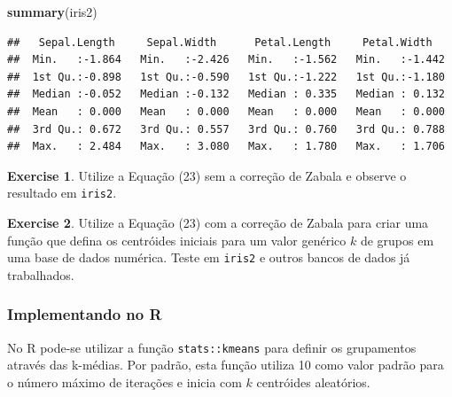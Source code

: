 \documentclass[
]{book}
\newenvironment{Shaded}{\begin{snugshade}}{\end{snugshade}}
\newcommand{\ControlFlowTok}[1]{\textcolor[rgb]{0.13,0.29,0.53}{\textbf{#1}}}
\newcommand{\DataTypeTok}[1]{\textcolor[rgb]{0.13,0.29,0.53}{#1}}
\newcommand{\DecValTok}[1]{\textcolor[rgb]{0.00,0.00,0.81}{#1}}
\newcommand{\KeywordTok}[1]{\textcolor[rgb]{0.13,0.29,0.53}{\textbf{#1}}}
\newcommand{\NormalTok}[1]{#1}
\newcommand{\OperatorTok}[1]{\textcolor[rgb]{0.81,0.36,0.00}{\textbf{#1}}}
\newcommand{\StringTok}[1]{\textcolor[rgb]{0.31,0.60,0.02}{#1}}
\theoremstyle{definition}
\theoremstyle{definition}
\theoremstyle{definition}
\newtheorem{exercise}{Exercise}[chapter]
\theoremstyle{remark}
\begin{document}
\begin{Shaded}
\begin{Highlighting}[]
\KeywordTok{summary}\NormalTok{(iris2)}
\end{Highlighting}
\end{Shaded}

\begin{verbatim}
##   Sepal.Length     Sepal.Width      Petal.Length     Petal.Width    
##  Min.   :-1.864   Min.   :-2.426   Min.   :-1.562   Min.   :-1.442  
##  1st Qu.:-0.898   1st Qu.:-0.590   1st Qu.:-1.222   1st Qu.:-1.180  
##  Median :-0.052   Median :-0.132   Median : 0.335   Median : 0.132  
##  Mean   : 0.000   Mean   : 0.000   Mean   : 0.000   Mean   : 0.000  
##  3rd Qu.: 0.672   3rd Qu.: 0.557   3rd Qu.: 0.760   3rd Qu.: 0.788  
##  Max.   : 2.484   Max.   : 3.080   Max.   : 1.780   Max.   : 1.706
\end{verbatim}

\begin{exercise}
\protect\hypertarget{exr:unnamed-chunk-166}{}{\label{exr:unnamed-chunk-166} }Utilize a Equação (23) sem a correção de Zabala e observe o resultado em \texttt{iris2}.
\end{exercise}

\begin{exercise}
\protect\hypertarget{exr:unnamed-chunk-167}{}{\label{exr:unnamed-chunk-167} }Utilize a Equação (23) com a correção de Zabala para criar uma função que defina os centróides iniciais para um valor genérico \(k\) de grupos em uma base de dados numérica. Teste em \texttt{iris2} e outros bancos de dados já trabalhados.
\end{exercise}

\hypertarget{implementando-no-r}{%
\subsubsection*{Implementando no R}\label{implementando-no-r}}

No R pode-se utilizar a função \texttt{stats::kmeans} para definir os grupamentos através das k-médias. Por padrão, esta função utiliza 10 como valor padrão para o número máximo de iterações e inicia com \(k\) centróides aleatórios.

\begin{Shaded}
\end{Shaded}
\end{document}
